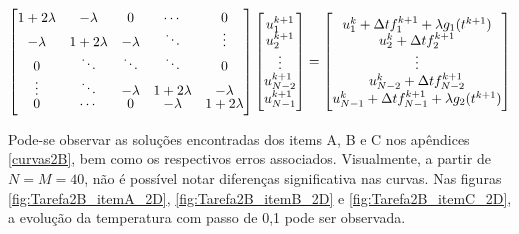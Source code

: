 \documentclass[12pt]{article}
\begin{document}
\begin{spacing}{1.5}
\begin{gather}\label{matrix:euler_implicito}
    \renewcommand*{\arraystretch}{0.75}
    \begin{bmatrix}
    1+2\lambda & -\lambda & 0 & \cdots & 0\\
    -\lambda & 1+2\lambda & -\lambda & \ddots & \vdots\\
    0 & \ddots & \ddots & \ddots & 0 \\
    \vdots & \ddots & -\lambda & 1+2\lambda & -\lambda \\
    0 & \cdots & 0 & -\lambda & 1+2\lambda
    \end{bmatrix}
    \begin{bmatrix}
    u_1^{k+1} \\
    u_2^{k+1} \\
    \vdots \\
    u_{N-2}^{k+1} \\
    u_{N-1}^{k+1}
    \end{bmatrix}
    =
    \begin{bmatrix}
    u_1^k + \Delta t f_1^{k+1} + \lambda g_1(t^{k+1}) \\
    u_2^k + \Delta t f_2^{k+1} \\
    \vdots \\
    u_{N-2}^k + \Delta t f_{N-2}^{k+1} \\
    u_{N-1}^k + \Delta t f_{N-1}^{k+1} + \lambda g_2(t^{k+1})
    \end{bmatrix}
\end{gather}

 Pode-se observar as soluções encontradas dos items A, B e C nos apêndices \ref{curvas2B}, bem como os respectivos erros associados. Visualmente, a partir de $N=M=40$, não é possível notar diferenças significativa nas curvas. Nas figuras \ref{fig:Tarefa2B_itemA_2D}, \ref{fig:Tarefa2B_itemB_2D} e \ref{fig:Tarefa2B_itemC_2D}, a evolução da temperatura com passo de 0,1 pode ser observada.


\end{spacing}
\end{document}
